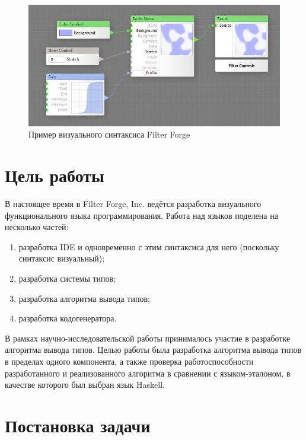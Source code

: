 \begin{figure}
	\centering
	\includegraphics[width=\textwidth]{img/forge.jpg}
	\caption{Пример визуального синтаксиса Filter Forge}\label{forge}
\end{figure}

\section*{Цель работы}
В настоящее время в Filter Forge, Inc. ведётся разработка визуального функционального языка программирования. Работа над языков поделена на несколько частей:
 \begin{enumerate}[1)]
 	\item разработка IDE и одновременно с этим синтаксиса для него (поскольку синтаксис визуальный);
 	\item разработка системы типов;
 	\item разработка алгоритма вывода типов;
 	\item разработка кодогенератора.
 \end{enumerate} 

В рамках научно-исследовательской работы принималось участие в разработке алгоритма вывода типов. Целью работы была разработка алгоритма вывода типов в пределах одного компонента, а также проверка работоспособности разработанного и реализованного алгоритма в сравнении с языком-эталоном, в качестве которого был выбран язык Haskell.
\section*{Постановка задачи}

